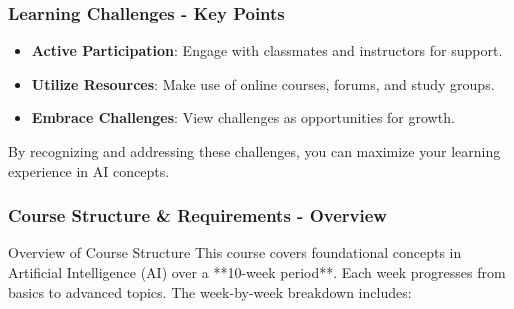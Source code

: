 \documentclass[aspectratio=169]{beamer}
\begin{document}
\begin{frame}[fragile]
    \frametitle{Learning Challenges - Key Points}
    \begin{itemize}
        \item \textbf{Active Participation}: Engage with classmates and instructors for support.
        \item \textbf{Utilize Resources}: Make use of online courses, forums, and study groups.
        \item \textbf{Embrace Challenges}: View challenges as opportunities for growth.
    \end{itemize}
    By recognizing and addressing these challenges, you can maximize your learning experience in AI concepts.
\end{frame}

\begin{frame}[fragile]
    \frametitle{Course Structure \& Requirements - Overview}
    \begin{block}{Overview of Course Structure}
        This course covers foundational concepts in Artificial Intelligence (AI) over a **10-week period**. Each week progresses from basics to advanced topics. The week-by-week breakdown includes:
    \end{block}
\end{frame}
\end{document}
